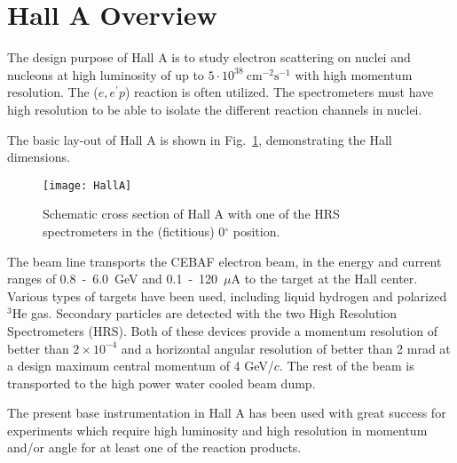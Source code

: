 \section[Hall A Overview]{Hall A Overview}
\label{sec:intro-halla-overview}

The design purpose of Hall A is to study electron scattering 
on nuclei and nucleons at high luminosity
of up to $5\cdot{}10^{38}~\mathrm{cm^{-2}s^{-1}}$ with high momentum
resolution. The ($e,e^{\prime}p$) reaction is often utilized.
The spectrometers must have high resolution 
to be able to isolate the different reaction channels in nuclei.

The basic lay-out of Hall A is shown in Fig.~\ref{fig:HallA-side},
demonstrating the Hall dimensions.

\begin{figure}[htb]
 \begin{center}
    \texttt{[image: HallA]}
 \end{center}
\caption[Hall A schematic cross section]%
{Schematic cross section of Hall A with one of the HRS 
spectrometers in the (fictitious) 0$^\circ$ position. 
}
\label{fig:HallA-side}
\end{figure}

The beam line transports the CEBAF electron beam, in the energy 
and current ranges of 0.8~-~6.0~GeV and 0.1~-~120~$\mu$A to the target
at the Hall center. Various types of targets have been used, including
liquid hydrogen and polarized $^3$He gas. Secondary particles
are detected with the  
two High Resolution Spectrometers (HRS). Both of these devices  
provide a momentum resolution of better than $2\times 10^{-4}$ and a horizontal angular 
resolution of better than 2 mrad at a design maximum central momentum 
of 4 GeV/$c$. The rest of the beam is transported to the high power
water cooled beam dump.

The present base instrumentation in Hall A has been used with great 
success for experiments which require high luminosity and high resolution 
in momentum and/or angle for at least one of the reaction products.
	
